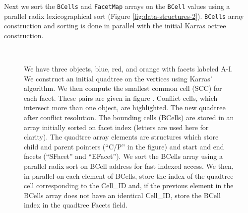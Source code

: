 \documentclass[submission]{gmp2017}
\begin{document}
Next we sort the \texttt{BCells} and \texttt{FacetMap} arrays on the \texttt{BCell} values using a parallel radix lexicographical sort (Figure \ref{fig:data-structures-2}). \texttt{BCells} array construction and sorting is done in parallel with the initial Karras octree construction.

\begin{figure}
  \centering
   \hfill
   \hfill
   \hfill
   \\
   \hfill
   \hfill
   \hfill
  \caption{
    \protect{} We have three objects, blue, red, and orange with facets labeled A-I.
    \protect{} We construct an initial quadtree on the vertices using Karras' algorithm.
    \protect{} We then compute the smallest common cell (SCC) for each facet. These pairs are given in figure \protect{}.
    \protect{} Conflict cells, which intersect more than one object, are highlighted.
    \protect{} The new quadtree after conflict resolution.
    \protect{} The bounding cells (BCells) are stored in an array initially sorted on facet index (letters are used here for clarity). The quadtree array elements are structures which store child and parent pointers (``C/P'' in the figure) and start and end facets (``SFacet'' and ``EFacet'').
    \protect{} We sort the BCells array using a parallel radix sort on BCell address for fast indexed access.
    \protect{} We then, in parallel on each element of BCells, store the index of the quadtree cell corresponding to the Cell\_ID and, if the previous element in the BCells array does not have an identical Cell\_ID, store the BCell index in the quadtree Facets field.
  }
  \label{fig:conflict-find}
\end{figure}
\end{document}
